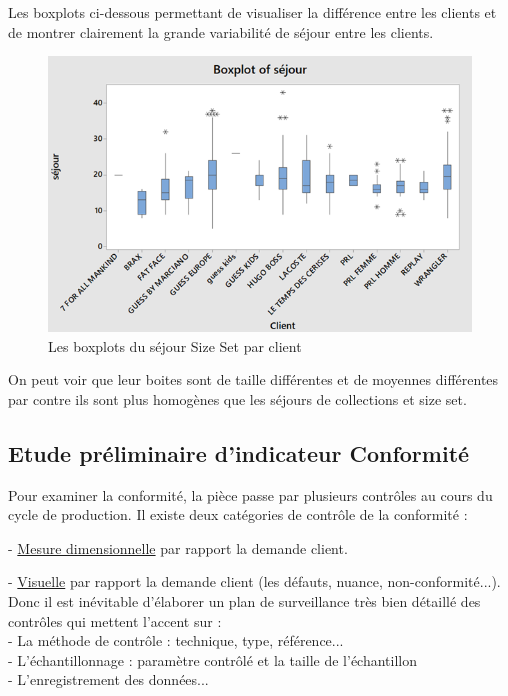 \documentclass[12pt, a4paper]{thesis}
\begin{document}
Les boxplots ci-dessous permettant de visualiser la différence entre les clients et de montrer clairement la grande variabilité de séjour entre les clients.
\begin{center}
\end{center}
\begin{figure}[!h]
\begin{center}
\includegraphics[scale=0.8]{boxsize.png}
\caption{Les boxplots du séjour Size Set par client}
\end{center}
\end{figure}

On peut voir que leur boites sont de taille différentes et de moyennes différentes par contre ils sont plus homogènes que les séjours de collections et size set.







\subsection{Etude préliminaire d'indicateur Conformité}
Pour examiner la conformité, la pièce passe par plusieurs contrôles au cours du cycle de production.
Il existe deux catégories de contrôle de la conformité : 
\item - \underline{Mesure dimensionnelle} par rapport la demande client.
\item - \underline{Visuelle} par rapport la demande client (les défauts, nuance, non-conformité...).\\
Donc il est inévitable d'élaborer un plan de surveillance très bien détaillé des contrôles qui mettent l'accent sur :\\
- La méthode de contrôle : technique, type, référence... \\
- L'échantillonnage : paramètre contrôlé et la taille de l'échantillon\\
- L'enregistrement des données...\\
\end{document}
